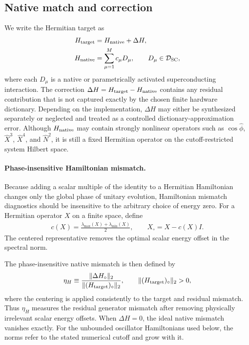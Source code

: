 \documentclass[pra,twocolumn,superscriptaddress,nofootinbib,floatfix]{revtex4-2}
\theoremstyle{remark}
\newcommand{\revcolor}{\color{blue}}
\DeclareRobustCommand{\rev}[1]{{\revcolor #1}}
\begin{document}
\subsection{\rev{Native match and correction}}
\label{subsec:native-match}

\rev{We write the Hermitian target as}
\begingroup\revcolor
\begin{align}
H_{\rm target}&=H_{\rm native}+\Delta H,\nonumber\\
H_{\rm native}&=\sum_{\mu=1}^{M}c_{\mu}D_{\mu},\qquad D_{\mu}\in\mathcal D_{\rm SC},
\label{eq:native-hamiltonian-dictionary}
\end{align}
\endgroup
where each \(D_{\mu}\) is a native or parametrically activated superconducting interaction. The correction \(\Delta H=H_{\rm target}-H_{\rm native}\) contains any residual contribution that is not captured exactly by the chosen finite hardware dictionary. Depending on the implementation, \(\Delta H\) may either be synthesized separately or neglected and treated as a controlled dictionary-approximation error. \rev{Although \(H_{\rm native}\) may contain strongly nonlinear operators such as \(\cos\hat\phi\), \(\hat X^3\), \(\hat X^4\), and \(\hat N^2\), it is still a fixed Hermitian operator on the cutoff-restricted system Hilbert space.}

\paragraph{Phase-insensitive Hamiltonian mismatch.}
Because adding a scalar multiple of the identity to a Hermitian Hamiltonian changes only the global phase of unitary evolution, Hamiltonian mismatch diagnostics should be insensitive to the arbitrary choice of energy zero. \rev{For a Hermitian operator \(X\) on a finite space, define}
\begin{align}
c(X)=\frac{\lambda_{\max}(X)+\lambda_{\min}(X)}{2},\qquad X_\circ=X-c(X)I .
\label{eq:energy-zero-convention}
\end{align}
The centered representative removes the optimal scalar energy offset in the spectral norm.

The phase-insensitive native mismatch is then defined by
\begin{align}
\eta_H\equiv\frac{\|\Delta H_\circ\|_2}{\|(H_{\rm target})_\circ\|_2},\qquad\|(H_{\rm target})_\circ\|_2>0,
\label{eq:phase-invariant-eta}
\end{align}
where the centering is applied consistently to the target and residual mismatch. Thus \(\eta_H\) measures the residual generator mismatch after removing physically irrelevant scalar energy offsets. When \(\Delta H=0\), the ideal native mismatch vanishes exactly. \rev{For the unbounded oscillator Hamiltonians used below, the norms refer to the stated numerical cutoff and grow with it.}
\end{document}
